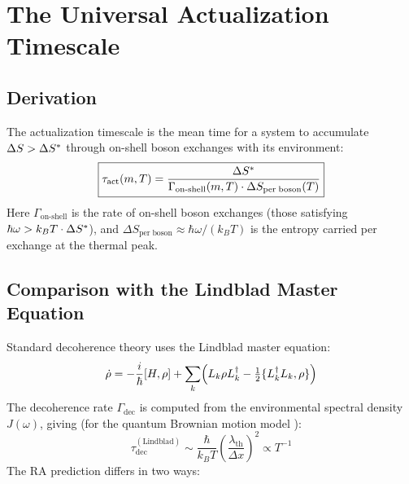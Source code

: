 \documentclass[12pt,a4paper]{article}
\begin{document}
\section{The Universal Actualization Timescale}\label{sec:tau}

\subsection{Derivation}

The actualization timescale is the mean time for a system to accumulate $\Delta S > \Delta S^*$ through on-shell boson exchanges with its environment:
\begin{equation}
  \boxed{\tau_{\mathrm{act}}(m,T) = \frac{\Delta S^*}{\Gamma_{\mathrm{on\text{-}shell}}(m,T) \cdot \Delta S_{\mathrm{per\;boson}}(T)}}
  \label{eq:tau}
\end{equation}
Here $\Gamma_{\mathrm{on\text{-}shell}}$ is the rate of on-shell boson exchanges (those satisfying $\hbar\omega > k_BT\cdot\Delta S^*$), and $\Delta S_{\mathrm{per\;boson}} \approx \hbar\omega/(k_BT)$ is the entropy carried per exchange at the thermal peak.

\subsection{Comparison with the Lindblad Master Equation}\label{sec:lindblad}

Standard decoherence theory uses the Lindblad master equation:
\begin{equation}
  \dot\rho = -\frac{i}{\hbar}[H,\rho] + \sum_k \Bigl(L_k\rho L_k^\dagger - \tfrac{1}{2}\{L_k^\dagger L_k,\rho\}\Bigr)
  \label{eq:lindblad}
\end{equation}
The decoherence rate $\Gamma_{\mathrm{dec}}$ is computed from the environmental spectral density $J(\omega)$, giving (for the quantum Brownian motion model \cite{Joos1985,Zurek2003}):
\begin{equation}
  \tau_{\mathrm{dec}}^{(\mathrm{Lindblad})} \sim \frac{\hbar}{k_BT}\left(\frac{\lambda_{\mathrm{th}}}{\Delta x}\right)^2 \propto T^{-1}
  \label{eq:lindblad_tau}
\end{equation}
The RA prediction differs in two ways:
\end{document}

